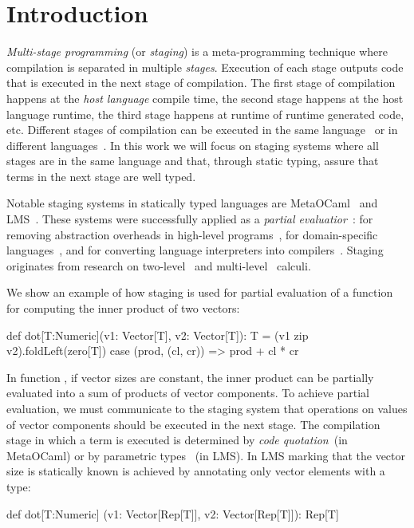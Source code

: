 \section{Introduction}
\label{sct:introduction}

 \emph{Multi-stage programming} (or \emph{staging}) is a meta-programming technique
  where compilation is separated in multiple \emph{stages}. Execution of each
  stage outputs code that is executed in the next stage of compilation. The first
  stage of compilation happens at the \emph{host language} compile time, the second
  stage happens at the host language runtime, the third stage happens at runtime of
  runtime generated code, etc. Different stages of compilation can be executed in the same
  language~\cite{taha_multi-stage_1997,nielson2005two} or in different languages~\cite{brown_heterogeneous_2011,devito2013terra}.
  In this work we will focus on staging systems where all stages are in the same language and that, through static typing, assure
  that terms in the next stage are well typed.

  Notable staging systems in statically typed languages are
  MetaOCaml~\cite{taha_multi-stage_1997,calcagno2003implementing}
  and LMS~\cite{rompf2012lightweight}. These systems were successfully applied as a
  \emph{partial evaluatior}~\cite{jones1993partial}: for removing abstraction
  overheads in high-level programs~\cite{carette2005multi,rompf2012lightweight},
  for domain-specific languages~\cite{czarnecki_dsl_2004,jonnalagedda2014staged,taha2004gentle}, and for converting language
  interpreters into compilers~\cite{lancet,futamura1999partial}. Staging originates
  from research on two-level~\cite{nielson2005two,davies1996temporal} and multi-level~\cite{davies1996modal} calculi.

 We show an example of how staging is used for partial evaluation of a function
 for computing the inner product of two vectors\footnotemark[1]:\begin{lstparagraph}
def dot[T:Numeric](v1: Vector[T], v2: Vector[T]): T =
  (v1 zip v2).foldLeft(zero[T]) {
    case (prod, (cl, cr)) => prod + cl * cr
  }
 \end{lstparagraph}

In function , if vector sizes are constant, the inner product can
 be partially evaluated into a sum of products of vector components. To achieve partial evaluation,
 we must communicate to the staging system that operations on values of vector components
 should be executed in the next stage. The compilation stage
 in which a term is executed is determined by \emph{code quotation}~(in MetaOCaml)
 or by parametric types ~(in LMS). In LMS marking
 that the vector size is statically known is achieved by annotating only vector elements with
 a  type\footnotemark[2]:\begin{lstparagraph}
def dot[T:Numeric]
  (v1: Vector[Rep[T]], v2: Vector[Rep[T]]): Rep[T]
 \end{lstparagraph}

